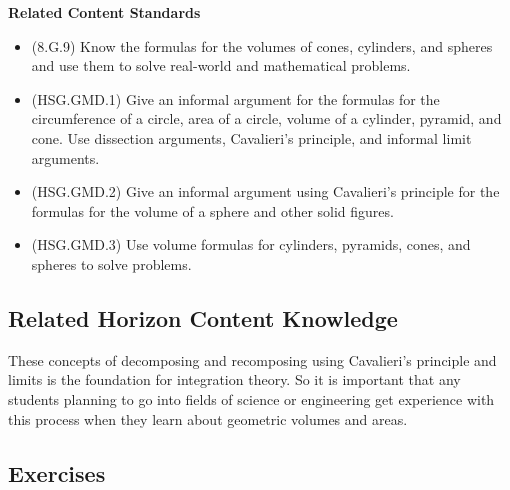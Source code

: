 \documentclass[
]{book}
\providecommand{\tightlist}{%
  \setlength{\itemsep}{0pt}\setlength{\parskip}{0pt}}
\newenvironment{standards}{}{}
\theoremstyle{definition}
\theoremstyle{definition}
\theoremstyle{definition}
\theoremstyle{definition}
\theoremstyle{remark}
\begin{document}
\begin{standards}

\begin{center}
\textbf{Related Content Standards}

\end{center}

\begin{itemize}
\tightlist
\item
  (8.G.9) Know the formulas for the volumes of cones, cylinders, and spheres and use them to solve real-world and mathematical problems.
\item
  (HSG.GMD.1) Give an informal argument for the formulas for the circumference of a circle, area of a circle, volume of a cylinder, pyramid, and cone. Use dissection arguments, Cavalieri's principle, and informal limit arguments.
\item
  (HSG.GMD.2) Give an informal argument using Cavalieri's principle for the formulas for the volume of a sphere and other solid figures.
\item
  (HSG.GMD.3) Use volume formulas for cylinders, pyramids, cones, and spheres to solve problems.
\end{itemize}

\end{standards}

\hypertarget{related-horizon-content-knowledge}{%
\subsection{Related Horizon Content Knowledge}\label{related-horizon-content-knowledge}}

These concepts of decomposing and recomposing using Cavalieri's principle and limits is the foundation for integration theory. So it is important that any students planning to go into fields of science or engineering get experience with this process when they learn about geometric volumes and areas.

\hypertarget{exercises-44}{%
\subsection{Exercises}\label{exercises-44}}
\end{document}

